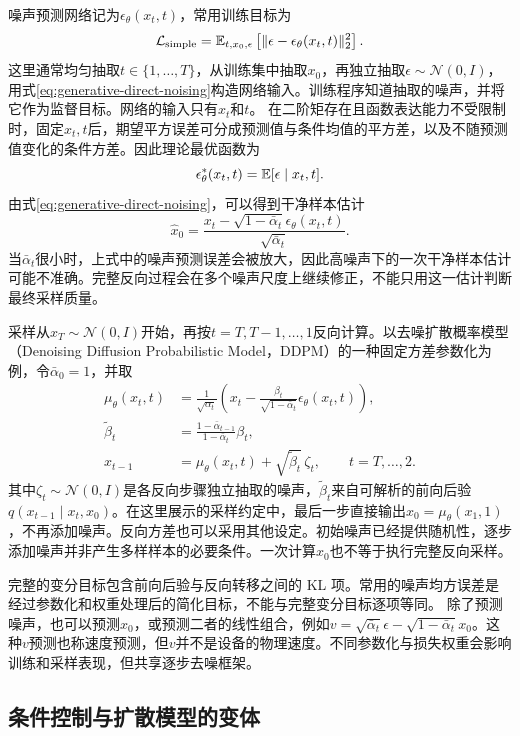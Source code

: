 噪声预测网络记为$\epsilon_{\theta}(x_t,t)$，常用训练目标为
\begin{equation}
\mathcal L_{\mathrm{simple}}=\mathbb{E}_{t,x_0,\epsilon}\left[\|\epsilon-\epsilon_{\theta}(x_t,t)\|_2^2\right].
\end{equation}
这里通常均匀抽取$t\in\{1,\ldots,T\}$，从训练集中抽取$x_0$，再独立抽取$\epsilon\sim\mathcal N(0,I)$，用式\eqref{eq:generative-direct-noising}构造网络输入。训练程序知道抽取的噪声，并将它作为监督目标。网络的输入只有$x_t$和$t$。
在二阶矩存在且函数表达能力不受限制时，固定$x_t,t$后，期望平方误差可分成预测值与条件均值的平方差，以及不随预测值变化的条件方差。因此理论最优函数为
\[
\epsilon_{\theta}^*(x_t,t)=\mathbb{E}[\epsilon\mid x_t,t].
\]
由式\eqref{eq:generative-direct-noising}，可以得到干净样本估计
\[
\widehat x_0=\frac{x_t-\sqrt{1-\bar\alpha_t}\epsilon_{\theta}(x_t,t)}{\sqrt{\bar\alpha_t}}.
\]
当$\bar\alpha_t$很小时，上式中的噪声预测误差会被放大，因此高噪声下的一次干净样本估计可能不准确。完整反向过程会在多个噪声尺度上继续修正，不能只用这一估计判断最终采样质量。

采样从$x_T\sim\mathcal N(0,I)$开始，再按$t=T,T-1,\ldots,1$反向计算。以去噪扩散概率模型（Denoising Diffusion Probabilistic Model，DDPM）的一种固定方差参数化为例，令$\bar\alpha_0=1$，并取
\begin{align}
\mu_{\theta}(x_t,t)&=\frac1{\sqrt{\alpha_t}}
\left(x_t-\frac{\beta_t}{\sqrt{1-\bar\alpha_t}}\epsilon_{\theta}(x_t,t)\right),\\
\widetilde\beta_t&=\frac{1-\bar\alpha_{t-1}}{1-\bar\alpha_t}\beta_t,\\
x_{t-1}&=\mu_{\theta}(x_t,t)+\sqrt{\widetilde\beta_t}\,\zeta_t,
\qquad t=T,\ldots,2.
\end{align}
其中$\zeta_t\sim\mathcal N(0,I)$是各反向步骤独立抽取的噪声，$\widetilde\beta_t$来自可解析的前向后验$q(x_{t-1}\mid x_t,x_0)$。在这里展示的采样约定中，最后一步直接输出$x_0=\mu_{\theta}(x_1,1)$，不再添加噪声。反向方差也可以采用其他设定。初始噪声已经提供随机性，逐步添加噪声并非产生多样样本的必要条件。一次计算$\widehat x_0$也不等于执行完整反向采样。

完整的变分目标包含前向后验与反向转移之间的 KL 项。常用的噪声均方误差是经过参数化和权重处理后的简化目标，不能与完整变分目标逐项等同。
除了预测噪声，也可以预测$x_0$，或预测二者的线性组合，例如$v=\sqrt{\bar\alpha_t}\epsilon-\sqrt{1-\bar\alpha_t}x_0$。这种$v$预测也称速度预测，但$v$并不是设备的物理速度。不同参数化与损失权重会影响训练和采样表现，但共享逐步去噪框架。

\subsection{条件控制与扩散模型的变体}

